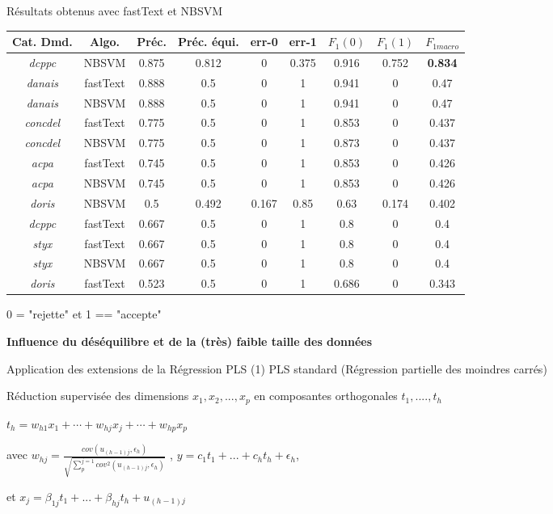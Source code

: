 \begin{frame}{Résultats obtenus avec fastText et NBSVM}

\begin{table}[htb]
	\tiny
	\begin{center}
		\begin{tabular}{|c|c|c|c|c|c|c|c|c|}
			\hline
			Cat. Dmd. & Algo. & {Préc.} & {Préc. équi.} & {err-0} & {err-1} & $F_1(0)$ & $F_1(1)$ & {$F_{1macro}$} \\ \hline
			\textit{dcppc} & NBSVM & 0.875 & 0.812 & 0 & 0.375 & 0.916 & 0.752 & \textbf{0.834} \\ \hline
			\textit{danais} & fastText & 0.888 & 0.5 & 0 & 1 & 0.941 & 0 & 0.47 \\ \hline
			\textit{danais} & NBSVM & 0.888 & 0.5 & 0 & 1 & 0.941 & 0 & 0.47 \\ \hline
			\textit{concdel} & fastText & 0.775 & 0.5 & 0 & 1 & 0.853 & 0 & 0.437 \\ \hline
			\textit{concdel} & NBSVM & 0.775 & 0.5 & 0 & 1 & 0.873 & 0 & 0.437 \\ \hline
			\textit{acpa} & fastText & 0.745 & 0.5 & 0 & 1 & 0.853 & 0 & 0.426 \\ \hline
			\textit{acpa} & NBSVM & 0.745 & 0.5 & 0 & 1 & 0.853 & 0 & 0.426 \\ \hline
			\textit{doris} & NBSVM & 0.5 & 0.492 & 0.167 & 0.85 & 0.63 & 0.174 & 0.402 \\ \hline
			\textit{dcppc} & fastText & 0.667 & 0.5 & 0 & 1 & 0.8 & 0 & 0.4 \\ \hline
			\textit{styx} & fastText & 0.667 & 0.5 & 0 & 1 & 0.8 & 0 & 0.4 \\ \hline
			\textit{styx} & NBSVM & 0.667 & 0.5 & 0 & 1 & 0.8 & 0 & 0.4 \\ \hline
			\textit{doris} & fastText & 0.523 & 0.5 & 0 & 1 & 0.686 & 0 & 0.343 \\ \hline
		\end{tabular}
	\end{center}
0 = "rejette" et 1 == "accepte"
\end{table}
\scriptsize
\textbf{Influence du déséquilibre et de la (très) faible taille des données}
\end{frame}

\begin{frame}{Application des extensions de la Régression PLS (1)}
PLS standard (Régression partielle des moindres carrés) 

Réduction supervisée des dimensions $x_1, x_2, ..., x_p$ en composantes orthogonales $t_1, ...., t_h$

$t_h = w_{h1} x_1 + \cdots + w_{hj} x_j + \cdots + w_{hp} x_p$

avec $w_{hj} = \frac{cov(u_{(h-1)j}, \epsilon_h)}{\sqrt{\sum_p^{j=1} cov^2(u_{(h-1)j}, \epsilon_h)}}$
, $y=c_1 t_1 + ... + c_h t_h + \epsilon_h$,

et $x_j=\beta_{1j} t_1 + ... + \beta_{hj} t_h + u_{(h-1)j}$


\end{frame}

